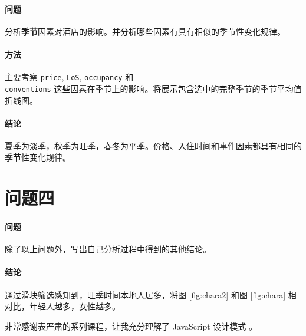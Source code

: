     \paragraph{问题} 分析\textbf{季节}因素对酒店的影响。并分析哪些因素有具有相似的季节性变化规律。

    \paragraph{方法} 主要考察 \verb"price", \verb"LoS", \verb"occupancy" 和\\ \verb"conventions" 这些因素在季节上的影响。将展示包含选中的完整季节的季节平均值折线图。

    \paragraph{结论} 夏季为淡季，秋季为旺季，春冬为平季。价格、入住时间和事件因素都具有相同的季节性变化规律。


    \section{问题四}\label{sec:four}

    \paragraph{问题} 除了以上问题外，写出自己分析过程中得到的其他结论。
    
    \paragraph{结论} 通过滑块筛选感知到，旺季时间本地人居多，将图 \ref{fig:chara2} 和图 \ref{fig:chara} 相对比，年轻人越多，女性越多。

    非常感谢表严肃的系列课程，让我充分理解了 JavaScript 设计模式 \cite{biao}。

    

